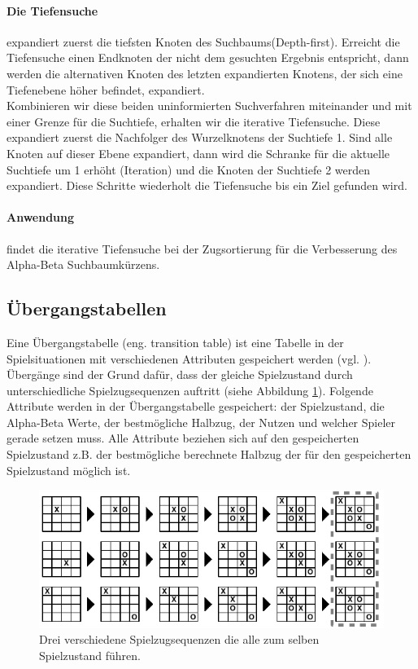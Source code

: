 \paragraph{Die Tiefensuche} expandiert zuerst die tiefsten Knoten des Suchbaums(Depth-first). Erreicht die Tiefensuche einen Endknoten der nicht dem gesuchten Ergebnis entspricht, dann werden die alternativen Knoten des letzten expandierten Knotens, der sich eine Tiefenebene höher befindet, expandiert. \\

Kombinieren wir diese beiden uninformierten Suchverfahren miteinander und mit einer Grenze für die Suchtiefe, erhalten wir die iterative Tiefensuche. Diese expandiert zuerst die Nachfolger des Wurzelknotens der Suchtiefe 1. Sind alle Knoten auf dieser Ebene expandiert, dann wird die Schranke für die aktuelle Suchtiefe um 1 erhöht (Iteration) und die Knoten der Suchtiefe 2 werden expandiert. Diese Schritte wiederholt die Tiefensuche bis ein Ziel gefunden wird.  

\paragraph{Anwendung} findet die iterative Tiefensuche bei der Zugsortierung für die Verbesserung des Alpha-Beta Suchbaumkürzens. 


\subsection{Übergangstabellen}
\label{subsec:Übergangstabellen}
Eine Übergangstabelle (eng. transition table) ist eine Tabelle in der Spielsituationen mit verschiedenen Attributen gespeichert werden (vgl. \cite[215\psq]{Russell}). Übergänge sind der Grund dafür, dass der gleiche Spielzustand durch unterschiedliche Spielzugsequenzen auftritt (siehe Abbildung \ref{fig:transitionen_tictactoe}). Folgende Attribute werden in der Übergangstabelle gespeichert: der Spielzustand, die Alpha-Beta Werte, der bestmögliche Halbzug, der Nutzen und welcher Spieler gerade setzen muss. Alle Attribute beziehen sich auf den gespeicherten Spielzustand z.B. der bestmögliche berechnete Halbzug der für den gespeicherten Spielzustand möglich ist. \\

\begin{figure}[!htbp]
  \centering
  \includegraphics{inhalt/abbildungen/transitionen_tictactoe.pdf}
  \caption{Drei verschiedene Spielzugsequenzen die alle zum selben Spielzustand führen.}
  \label{fig:transitionen_tictactoe}
\end{figure} 


